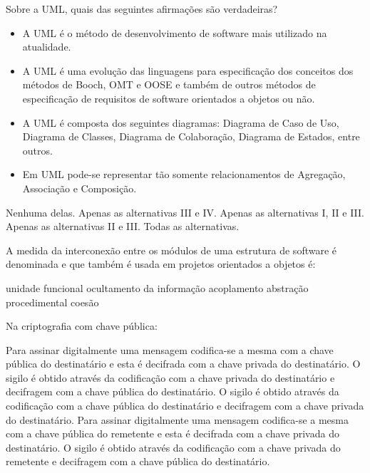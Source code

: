 \documentclass[12pt, addpoints]{exam}
\begin{document}
\begin{questions}
\question

Sobre a UML, quais das seguintes afirmações são verdadeiras?



\begin{itemize}

    \item[I)] A UML é o método de desenvolvimento de software mais utilizado na atualidade.

    \item[II)] A UML é uma evolução das linguagens para especificação dos conceitos dos métodos de Booch, OMT e OOSE e também de outros métodos de especificação de requisitos de software orientados a objetos ou não.

    \item[III)] A UML é composta dos seguintes diagramas: Diagrama de Caso de Uso, Diagrama de Classes, Diagrama de Colaboração, Diagrama de Estados, entre outros.

    \item[IV)] Em UML pode-se representar tão somente relacionamentos de Agregação, Associação e Composição.

\end{itemize}
\begin{choices}
\choice Nenhuma delas.
\choice Apenas as alternativas III e IV.
\choice Apenas as alternativas I, II e III.
\choice Apenas as alternativas II e III.
\choice Todas as alternativas.
\end{choices}

\question

A medida da interconexão entre os módulos de uma estrutura de software é denominada e que também é usada em projetos orientados a objetos é: 
\begin{choices}
\choice unidade funcional
\choice ocultamento da informação
\choice acoplamento
\choice abstração procedimental
\choice coesão
\end{choices}

\question

Na criptografia com chave pública:


\begin{choices}
\choice Para assinar digitalmente uma mensagem codifica-se a mesma com a chave pública do destinatário e esta é decifrada com a chave privada do destinatário.
\choice O sigilo é obtido através da codificação com a chave privada do destinatário e decifragem com a chave pública do destinatário.
\choice O sigilo é obtido através da codificação com a chave pública do destinatário e decifragem com a chave privada do destinatário.
\choice Para assinar digitalmente uma mensagem codifica-se a mesma com a chave pública do remetente e esta é decifrada com a chave privada do destinatário.
\choice O sigilo é obtido através da codificação com a chave privada do remetente e decifragem com a chave pública do destinatário.
\end{choices}


\end{questions}
\end{document}
